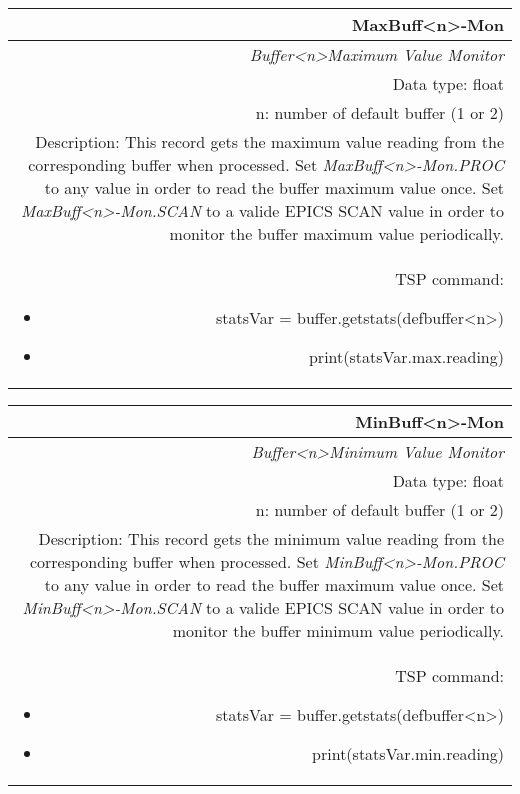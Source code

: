 \documentclass[openany]{article}
\begin{document}
		\begin{tabular}{N}
			\hline
			\bfseries MaxBuff\textless n\textgreater-Mon\label{pv:maxbuff-mon} \\ \hline
			\emph{Buffer\textless n\textgreater Maximum Value Monitor} \\
			Data type: float \\
			n: number of default buffer (1 or 2) \\
			Description: This record gets the maximum value reading from the corresponding buffer when processed. Set \emph{MaxBuff\textless n\textgreater-Mon.PROC} to any value in order to read the buffer maximum value once. Set \emph{MaxBuff\textless n\textgreater-Mon.SCAN} to a valide EPICS SCAN value in order to monitor the buffer maximum value periodically. \\
			TSP command: \begin{itemize} \item[] statsVar = buffer.getstats(defbuffer\textless n\textgreater) \item[] print(statsVar.max.reading) \end{itemize}
		\end{tabular}

		\begin{tabular}{N}
			\hline
			\bfseries MinBuff\textless n\textgreater-Mon\label{pv:minbuff-mon} \\ \hline
			\emph{Buffer\textless n\textgreater Minimum Value Monitor} \\
			Data type: float \\
			n: number of default buffer (1 or 2) \\
			Description: This record gets the minimum value reading from the corresponding buffer when processed. Set \emph{MinBuff\textless n\textgreater-Mon.PROC} to any value in order to read the buffer maximum value once. Set \emph{MinBuff\textless n\textgreater-Mon.SCAN} to a valide EPICS SCAN value in order to monitor the buffer minimum value periodically. \\
			TSP command: \begin{itemize} \item[] statsVar = buffer.getstats(defbuffer\textless n\textgreater) \item[] print(statsVar.min.reading) \end{itemize}
		\end{tabular}
\end{document}
